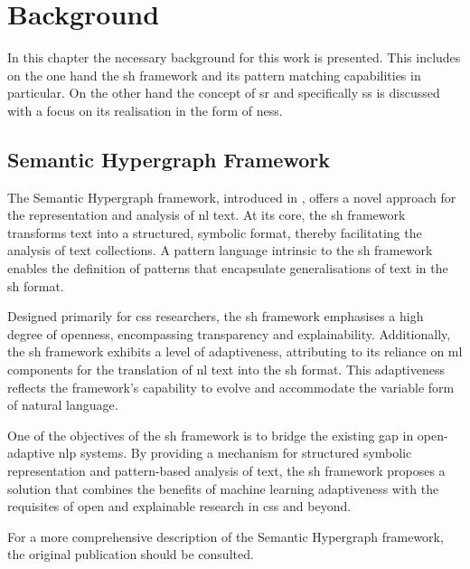 \documentclass[11pt, numbers=noenddot]{scrreprt}
\let\citef\cite  %
\let\cite\parencite  %
\begin{document}
\chapter{Background}

\label{cha:background}
In this chapter the necessary background for this work is presented. This includes on the one hand the \gls{sh} framework and its pattern matching capabilities in particular. On the other hand the concept of \gls{sr} and specifically \gls{ss} is discussed with a focus on its realisation in the form of \gls{ness}.

\section{Semantic Hypergraph Framework}
\label{sec:semantic-hypergraph-framework}

The Semantic Hypergraph framework, introduced in \citef{menezesSemanticHypergraphs2021}, offers a novel approach for the representation and analysis of \gls{nl} text. At its core, the \gls{sh} framework transforms text into a structured, symbolic format, thereby facilitating the analysis of text collections. A pattern language intrinsic to the \gls{sh} framework enables the definition of patterns that encapsulate generalisations of text in the \gls{sh} format.

Designed primarily for \gls{css} researchers, the \gls{sh} framework emphasises a high degree of openness, encompassing transparency and explainability. Additionally, the \gls{sh} framework exhibits a level of adaptiveness, attributing to its reliance on \gls{ml} components for the translation of \gls{nl} text into the \gls{sh} format. This adaptiveness reflects the framework's capability to evolve and accommodate the variable form of natural language.

One of the objectives of the \gls{sh} framework is to bridge the existing gap in open-adaptive \gls{nlp} systems. By providing a mechanism for structured symbolic representation and pattern-based analysis of text, the \gls{sh} framework proposes a solution that combines the benefits of machine learning adaptiveness with the requisites of open and explainable research in \gls{css} and beyond.

For a more comprehensive description of the Semantic Hypergraph framework, the original publication \cite{menezesSemanticHypergraphs2021} should be consulted.
\end{document}
